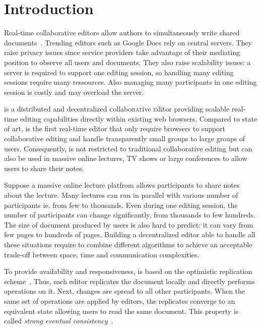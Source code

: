 
\section{Introduction}
\label{sec:introduction}

Real-time collaborative editors allow authors to simultaneously write
shared documents~\cite{greenberg1994real}. Trending editors such as
Google Docs rely on central servers. They raise privacy issues since
service providers take advantage of their mediating position to
observe all users and documents. They also raise scalability issues: a
server is required to support one editing session, so handling many
editing sessions require many ressources. Also managing many
participants in one editing session is costly and may overload the server.

\CRATE is a distributed and decentralized
\textsc{c}ollabo\textsc{rat}ive \textsc{e}ditor providing scalable
real-time editing capabilities directly within existing web
browsers. Compared to state of art, \CRATE is the first real-time
editor that only require browsers to support collaborative editing and
handle transparently small groups to large groups of
users. Consequently, \CRATE is not restricted to traditional
collaborative editing but can also be used in massive online lectures,
TV shows or large conferences to allow users to share their
notes. 

Suppose a massive online lecture platfrom allows participants to share
notes about the lecture. Many lectures can run in parallel with
various number of participants ie. from few to thousands. Even during
one editing session, the number of participants can change
significantly, from thousands to few hundreds. The size of document
produced by users is also hard to predict: it can vary from few pages
to hundreds of pages. Building a decentralized editor able to handle
all these situations require to combine different algorithms to
achieve an acceptable trade-off between space, time and communication
complexities.

To provide availability and responsiveness, \CRATE is based on the
optimistic replication scheme~\cite{saito2005optimistic}. Thus, each
editor replicates the document locally and directly performs
operations on it. Next, changes are spread to all other
participants. When the same set of operations are applied by editors,
the replicates converge to an equivalent state allowing users to read
the same document.  This property is called \emph{strong eventual
  consistency}~\cite{bailis2013eventual}.

